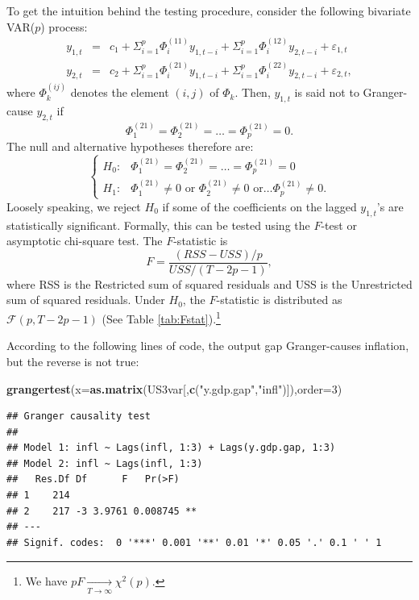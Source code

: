 \documentclass[
  11pt,
]{book}
\newenvironment{Shaded}{\begin{snugshade}}{\end{snugshade}}
\newcommand{\AttributeTok}[1]{\textcolor[rgb]{0.13,0.29,0.53}{#1}}
\newcommand{\DecValTok}[1]{\textcolor[rgb]{0.00,0.00,0.81}{#1}}
\newcommand{\FunctionTok}[1]{\textcolor[rgb]{0.13,0.29,0.53}{\textbf{#1}}}
\newcommand{\NormalTok}[1]{#1}
\newcommand{\StringTok}[1]{\textcolor[rgb]{0.31,0.60,0.02}{#1}}
\theoremstyle{definition}
\theoremstyle{definition}
\theoremstyle{definition}
\theoremstyle{definition}
\theoremstyle{remark}
\begin{document}
To get the intuition behind the testing procedure, consider the following
bivariate VAR(\(p\)) process:
\begin{eqnarray*}
y_{1,t} & = & c_1+\Sigma_{i=1}^{p}\Phi_i^{(11)}y_{1,t-i}+\Sigma_{i=1}^{p}\Phi_i^{(12)}y_{2,t-i}+\varepsilon_{1,t}\\
y_{2,t} & = & c_2+\Sigma_{i=1}^{p}\Phi_i^{(21)}y_{1,t-i}+\Sigma_{i=1}^{p}\Phi_i^{(22)}y_{2,t-i}+\varepsilon_{2,t},
\end{eqnarray*}
where \(\Phi_k^{(ij)}\) denotes the element \((i,j)\) of \(\Phi_k\). Then, \(y_{1,t}\) is said not to Granger-cause \(y_{2,t}\) if
\[
\Phi_1^{(21)}=\Phi_2^{(21)}=\ldots=\Phi_p^{(21)}=0.
\]
The null and alternative hypotheses therefore are:
\[
\begin{cases}
H_{0}: & \Phi_1^{(21)}=\Phi_2^{(21)}=\ldots=\Phi_p^{(21)}=0\\
H_{1}: & \Phi_1^{(21)}\neq0\mbox{ or }\Phi_2^{(21)}\neq0\mbox{ or}\ldots\Phi_p^{(21)}\neq0.\end{cases}
\]
Loosely speaking, we reject \(H_{0}\) if some of the coefficients on the lagged \(y_{1,t}\)'s are statistically significant. Formally, this can be tested using the \(F\)-test or asymptotic chi-square test. The \(F\)-statistic is
\[
F=\frac{(RSS-USS)/p}{USS/(T-2p-1)},
\]
where RSS is the Restricted sum of squared residuals and USS is the Unrestricted sum of squared residuals. Under \(H_{0}\), the \(F\)-statistic is distributed as \(\mathcal{F}(p,T-2p-1)\) (See Table \ref{tab:Fstat}).\footnote{We have \(pF\underset{T \rightarrow \infty}{\rightarrow}\chi^{2}(p)\).}

According to the following lines of code, the output gap Granger-causes inflation, but the reverse is not true:

\begin{Shaded}
\begin{Highlighting}[]
\FunctionTok{grangertest}\NormalTok{(}\AttributeTok{x=}\FunctionTok{as.matrix}\NormalTok{(US3var[,}\FunctionTok{c}\NormalTok{(}\StringTok{"y.gdp.gap"}\NormalTok{,}\StringTok{"infl"}\NormalTok{)]),}\AttributeTok{order=}\DecValTok{3}\NormalTok{)}
\end{Highlighting}
\end{Shaded}

\begin{verbatim}
## Granger causality test
## 
## Model 1: infl ~ Lags(infl, 1:3) + Lags(y.gdp.gap, 1:3)
## Model 2: infl ~ Lags(infl, 1:3)
##   Res.Df Df      F   Pr(>F)   
## 1    214                      
## 2    217 -3 3.9761 0.008745 **
## ---
## Signif. codes:  0 '***' 0.001 '**' 0.01 '*' 0.05 '.' 0.1 ' ' 1
\end{verbatim}
\end{document}
